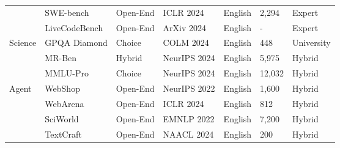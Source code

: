 \begin{table*}[tbhp]
{\begin{tabular}{lllllll}
&  SWE-bench \cite{jimenez2024swebench} & Open-End  &  ICLR 2024    &  English         &  2,294  &  Expert             \\

& \cellcolor[rgb]{ .949,  .949,  .949}LiveCodeBench   \cite{jain2024livecodebench}     & \cellcolor[rgb]{ .949,  .949,  .949} Open-End   &\cellcolor[rgb]{ .949,  .949,  .949} ArXiv 2024   & \cellcolor[rgb]{ .949,  .949,  .949}English         & \cellcolor[rgb]{ .949,  .949,  .949}-      & \cellcolor[rgb]{ .949,  .949,  .949}Expert             \\

\hline
\multirow{3}{*}{Science} 
&  GPQA Diamond \cite{rein2024gpqa}   & Choice &  COLM 2024    &  English         & 448    &  University  \\

& \cellcolor[rgb]{ .949,  .949,  .949} MR-Ben \cite{ZengLWLCDYXQZSL24}        & \cellcolor[rgb]{ .949,  .949,  .949} Hybrid & \cellcolor[rgb]{ .949,  .949,  .949}NeurIPS 2024 & \cellcolor[rgb]{ .949,  .949,  .949}English         & \cellcolor[rgb]{ .949,  .949,  .949}5,975 & \cellcolor[rgb]{ .949,  .949,  .949} Hybrid             \\

 & \cellcolor[rgb]{ .949,  .949,  .949}MMLU-Pro \cite{wang2024mmlu} & \cellcolor[rgb]{ .949,  .949,  .949}Choice  & \cellcolor[rgb]{ .949,  .949,  .949}NeurIPS 2024 & \cellcolor[rgb]{ .949,  .949,  .949}English         & \cellcolor[rgb]{ .949,  .949,  .949}12,032 & \cellcolor[rgb]{ .949,  .949,  .949}Hybrid             \\

\hline

\multirow{4}{*}{Agent}         
&  WebShop \cite{yao2022webshop}  & Open-End                   
&  NeurIPS 2022 &  English  &  1,600  & Hybrid \\

& \cellcolor[rgb]{ .949,  .949,  .949} WebArena  \cite{zhou2023webarena} & \cellcolor[rgb]{ .949,  .949,  .949}Open-End  & \cellcolor[rgb]{ .949,  .949,  .949}ICLR 2024    & \cellcolor[rgb]{ .949,  .949,  .949}English         & \cellcolor[rgb]{ .949,  .949,  .949}812    & \cellcolor[rgb]{ .949,  .949,  .949}Hybrid             \\

&  SciWorld   \cite{scienceworld2022}  & Open-End &  EMNLP 2022   & English   & 7,200  &  Hybrid  \\

& \cellcolor[rgb]{ .949,  .949,  .949}TextCraft   \cite{prasad2024adapt} & \cellcolor[rgb]{ .949,  .949,  .949}Open-End  & \cellcolor[rgb]{ .949,  .949,  .949}NAACL 2024   & \cellcolor[rgb]{ .949,  .949,  .949}English         & \cellcolor[rgb]{ .949,  .949,  .949}200    & \cellcolor[rgb]{ .949,  .949,  .949}Hybrid             \\


\end{tabular}}
\end{table*}
